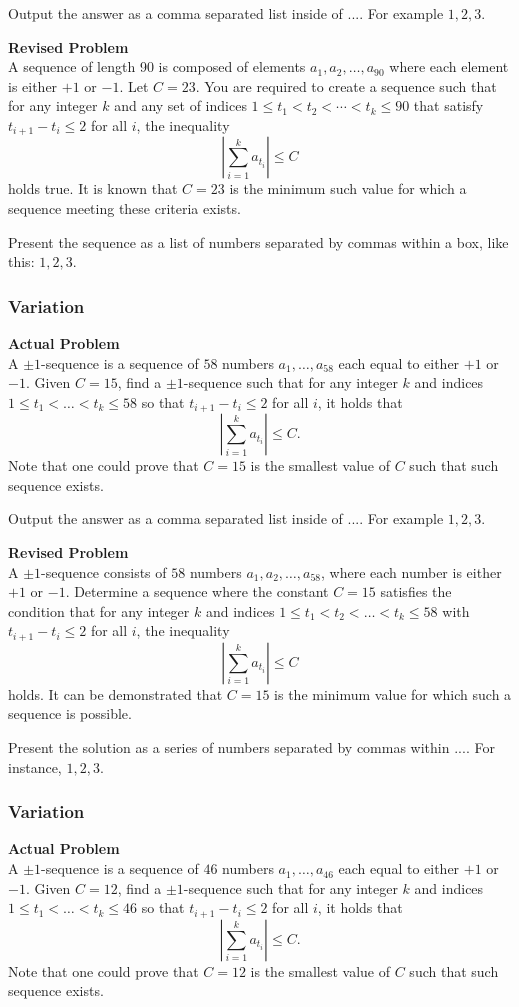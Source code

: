 Output the answer as a comma separated list inside of $\boxed{...}$. For example $\boxed{1, 2, 3}$.

\textbf{Revised Problem}\\
A sequence of length 90 is composed of elements $a_1, a_2, \ldots, a_{90}$ where each element is either $+1$ or $-1$. Let $C = 23$. You are required to create a sequence such that for any integer $k$ and any set of indices $1 \le t_1 < t_2 < \cdots < t_k \le 90$ that satisfy $t_{i+1} - t_i \le 2$ for all $i$, the inequality $$\left| \sum_{i=1}^{k} a_{t_i} \right| \leq C$$ holds true. It is known that $C = 23$ is the minimum such value for which a sequence meeting these criteria exists.

Present the sequence as a list of numbers separated by commas within a box, like this: $\boxed{1, 2, 3}$.

\subsubsection{Variation}
\textbf{Actual Problem}\\
A $\pm 1$-sequence is a sequence of $58$ numbers $a_1, \ldots, a_{58}$ each equal to either $+1$ or $-1$. 
Given $C = 15$, find a $\pm 1$-sequence such that for any integer $k$ and indices $1 \le t_1 < \ldots < t_k \le 58$ so that $t_{i+1} - t_i \le 2$ for all $i$, it holds that $$\left| \sum_{i = 1}^{k} a_{t_i} \right| \leq C.$$
Note that one could prove that $C = 15$ is the smallest value of $C$ such that such sequence exists.


Output the answer as a comma separated list inside of $\boxed{...}$. For example $\boxed{1, 2, 3}$.

\textbf{Revised Problem}\\
A $\pm 1$-sequence consists of $58$ numbers $a_1, a_2, \ldots, a_{58}$, where each number is either $+1$ or $-1$. Determine a sequence where the constant $C = 15$ satisfies the condition that for any integer $k$ and indices $1 \le t_1 < t_2 < \ldots < t_k \le 58$ with $t_{i+1} - t_i \le 2$ for all $i$, the inequality $$\left| \sum_{i=1}^{k} a_{t_i} \right| \leq C$$ holds. It can be demonstrated that $C = 15$ is the minimum value for which such a sequence is possible.

Present the solution as a series of numbers separated by commas within $\boxed{...}$. For instance, $\boxed{1, 2, 3}$.

\subsubsection{Variation}
\textbf{Actual Problem}\\
A $\pm 1$-sequence is a sequence of $46$ numbers $a_1, \ldots, a_{46}$ each equal to either $+1$ or $-1$. 
Given $C = 12$, find a $\pm 1$-sequence such that for any integer $k$ and indices $1 \le t_1 < \ldots < t_k \le 46$ so that $t_{i+1} - t_i \le 2$ for all $i$, it holds that $$\left| \sum_{i = 1}^{k} a_{t_i} \right| \leq C.$$
Note that one could prove that $C = 12$ is the smallest value of $C$ such that such sequence exists.


